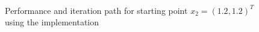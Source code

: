 \begin{figure}
    \mbox{ \quad {}}
    \caption{Performance and iteration path for starting point $x_2=(1.2, 1.2)^T$ using the  implementation}
    \label{fig:convergence-start2-my-impl}
\end{figure}


